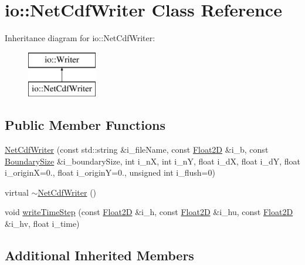\hypertarget{classio_1_1NetCdfWriter}{\section{io\-:\-:Net\-Cdf\-Writer Class Reference}
\label{classio_1_1NetCdfWriter}
}
Inheritance diagram for io\-:\-:Net\-Cdf\-Writer\-:\begin{figure}[H]
\begin{center}
\leavevmode
\includegraphics[height=2.000000cm]{classio_1_1NetCdfWriter}
\end{center}
\end{figure}
\subsection*{Public Member Functions}
\begin{DoxyCompactItemize}
\item 
\hyperlink{classio_1_1NetCdfWriter_aa700eb0fd5b7cc38a401da8e39ebd0c8}{Net\-Cdf\-Writer} (const std\-::string \&i\-\_\-file\-Name, const \hyperlink{classFloat2D}{Float2\-D} \&i\-\_\-b, const \hyperlink{structio_1_1BoundarySize}{Boundary\-Size} \&i\-\_\-boundary\-Size, int i\-\_\-n\-X, int i\-\_\-n\-Y, float i\-\_\-d\-X, float i\-\_\-d\-Y, float i\-\_\-origin\-X=0., float i\-\_\-origin\-Y=0., unsigned int i\-\_\-flush=0)
\item 
virtual \hyperlink{classio_1_1NetCdfWriter_ace10f1b56bbb4a1b6c2092ed661a1a0d}{$\sim$\-Net\-Cdf\-Writer} ()
\item 
void \hyperlink{classio_1_1NetCdfWriter_a8e49f21f16b1720a348de50485754b0c}{write\-Time\-Step} (const \hyperlink{classFloat2D}{Float2\-D} \&i\-\_\-h, const \hyperlink{classFloat2D}{Float2\-D} \&i\-\_\-hu, const \hyperlink{classFloat2D}{Float2\-D} \&i\-\_\-hv, float i\-\_\-time)
\end{DoxyCompactItemize}
\subsection*{Additional Inherited Members}


